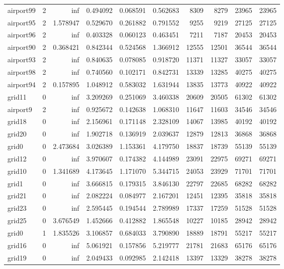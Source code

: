 \begin{longtable}{|l|r|r|r|r|r|r|r|r|r|}
airport99 & 2 & inf & 0.494092 & 0.068591 & 0.562683 & 8309 & 8279 & 23965 & 23965 \\
airport95 & 2 & 1.578947 & 0.529670 & 0.261882 & 0.791552 & 9255 & 9219 & 27125 & 27125 \\
airport96 & 2 & inf & 0.403328 & 0.060123 & 0.463451 & 7211 & 7187 & 20453 & 20453 \\
airport90 & 2 & 0.368421 & 0.842344 & 0.524568 & 1.366912 & 12555 & 12501 & 36544 & 36544 \\
airport93 & 2 & inf & 0.840635 & 0.078085 & 0.918720 & 11371 & 11327 & 33057 & 33057 \\
airport98 & 2 & inf & 0.740560 & 0.102171 & 0.842731 & 13339 & 13285 & 40275 & 40275 \\
airport94 & 2 & 0.157895 & 1.048912 & 0.583032 & 1.631944 & 13835 & 13773 & 40922 & 40922 \\
grid11 & 0 & inf & 3.209269 & 0.251069 & 3.460338 & 20609 & 20505 & 61302 & 61302 \\
airport9 & 2 & inf & 0.925672 & 0.142638 & 1.068310 & 11647 & 11603 & 34546 & 34546 \\
grid18 & 0 & inf & 2.156961 & 0.171148 & 2.328109 & 14067 & 13985 & 40192 & 40192 \\
grid20 & 0 & inf & 1.902718 & 0.136919 & 2.039637 & 12879 & 12813 & 36868 & 36868 \\
grid0 & 0 & 2.473684 & 3.026389 & 1.153361 & 4.179750 & 18837 & 18739 & 55139 & 55139 \\
grid12 & 0 & inf & 3.970607 & 0.174382 & 4.144989 & 23091 & 22975 & 69271 & 69271 \\
grid10 & 0 & 1.341689 & 4.173645 & 1.171070 & 5.344715 & 24053 & 23929 & 71701 & 71701 \\
grid1 & 0 & inf & 3.666815 & 0.179315 & 3.846130 & 22797 & 22685 & 68282 & 68282 \\
grid21 & 0 & inf & 2.082224 & 0.084977 & 2.167201 & 12451 & 12395 & 35818 & 35818 \\
grid23 & 0 & inf & 2.595445 & 0.194544 & 2.789989 & 17337 & 17259 & 51528 & 51528 \\
grid25 & 0 & 3.676549 & 1.452666 & 0.412882 & 1.865548 & 10227 & 10185 & 28942 & 28942 \\
grid0 & 1 & 1.835526 & 3.106857 & 0.684033 & 3.790890 & 18889 & 18791 & 55217 & 55217 \\
grid16 & 0 & inf & 5.061921 & 0.157856 & 5.219777 & 21781 & 21683 & 65176 & 65176 \\
grid19 & 0 & inf & 2.049433 & 0.092985 & 2.142418 & 13397 & 13329 & 38278 & 38278 \\

\end{longtable}
